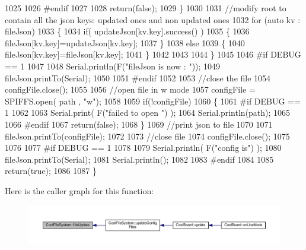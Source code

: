 \begin{DoxyCode}
1025 
1026 \textcolor{preprocessor}{    #endif}
1027 
1028         \textcolor{keywordflow}{return}(\textcolor{keyword}{false});
1029     \}
1030     
1031     \textcolor{comment}{//modify root to contain all the json keys: updated ones and non updated ones}
1032     \textcolor{keywordflow}{for} (\textcolor{keyword}{auto} kv : fileJson) 
1033     \{
1034         \textcolor{keywordflow}{if}( updateJson[kv.key].success() )
1035         \{
1036             fileJson[kv.key]=updateJson[kv.key];            
1037         \}
1038         \textcolor{keywordflow}{else}
1039         \{
1040             fileJson[kv.key]=fileJson[kv.key];
1041         \}
1042 
1043                 
1044     \}
1045 
1046 \textcolor{preprocessor}{#if DEBUG == 1}
1047 
1048     Serial.println(F(\textcolor{stringliteral}{"fileJson is now : "}));
1049     fileJson.printTo(Serial);
1050 
1051 \textcolor{preprocessor}{#endif}
1052 
1053     \textcolor{comment}{//close the file}
1054     configFile.close();
1055 
1056     \textcolor{comment}{//open file in w mode}
1057     configFile = SPIFFS.open( path , \textcolor{stringliteral}{"w"});
1058     
1059     \textcolor{keywordflow}{if}(!configFile)
1060     \{   
1061 \textcolor{preprocessor}{    #if DEBUG == 1}
1062         
1063         Serial.print( F(\textcolor{stringliteral}{"failed to open "}) );
1064         Serial.println(path);
1065 
1066 \textcolor{preprocessor}{    #endif}
1067         \textcolor{keywordflow}{return}(\textcolor{keyword}{false});
1068     \}
1069     \textcolor{comment}{//print json to file    }
1070     
1071     fileJson.printTo(configFile);
1072     
1073     \textcolor{comment}{//close file}
1074     configFile.close();
1075 
1076 
1077 \textcolor{preprocessor}{#if DEBUG == 1}
1078 
1079     Serial.println( F(\textcolor{stringliteral}{"config is"}) );
1080     fileJson.printTo(Serial);
1081     Serial.println();
1082 
1083 \textcolor{preprocessor}{#endif}
1084     
1085     \textcolor{keywordflow}{return}(\textcolor{keyword}{true});
1086     
1087 \}
\end{DoxyCode}
Here is the caller graph for this function\+:
\nopagebreak
\begin{figure}[H]
\begin{center}
\leavevmode
\includegraphics[width=350pt]{db/d0c/class_cool_file_system_a13f2958f5b87757c31fc53797a30d23a_icgraph}
\end{center}
\end{figure}
\mbox{\label{class_cool_file_system_a70701d05e811604af1b531f4f6dc69ed}} 
